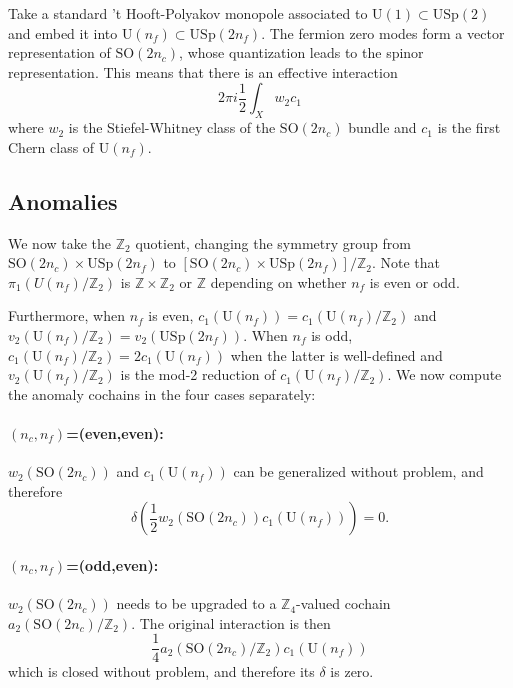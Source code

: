 \documentclass[12pt]{article}
\numberwithin{equation}{section}
\def\bZ{\mathbb{Z}}
\def\U{\mathrm{U}}
\def\SO{\mathrm{SO}}
\def\USp{\mathrm{USp}}
\begin{document}
Take a standard 't Hooft-Polyakov monopole associated to $\U(1)\subset \USp(2)$
and embed it into  $\U(n_f)\subset \USp(2n_f)$.
The fermion zero modes form a vector representation of $\SO(2n_c)$,
whose quantization leads to the spinor representation.
This means that there is an effective interaction \begin{equation}
2\pi i \frac12 \int_X w_2 c_1
\end{equation} where $w_2$ is the Stiefel-Whitney class of the $\SO(2n_c)$ bundle
and $c_1$ is the first Chern class of $\U(n_f)$.

\subsection{Anomalies}
We now take the $\bZ_2$ quotient, changing the symmetry group from 
$\SO(2n_c)\times \USp(2n_f)$ to $[\SO(2n_c)\times \USp(2n_f)]/\bZ_2$.
Note that $\pi_1(U(n_f)/\bZ_2)$ is $\bZ\times \bZ_2$  or $\bZ$ depending on whether $n_f$ is even or odd.

Furthermore, when $n_f$ is even, $c_1(\U(n_f)) = c_1(\U(n_f)/\bZ_2)$ and $v_2(\U(n_f)/\bZ_2)=v_2(\USp(2n_f))$.
When $n_f$ is odd, $c_1(\U(n_f)/\bZ_2)=2 c_1(\U(n_f))$ when the latter is well-defined and $v_2(\U(n_f)/\bZ_2)$ is the mod-2 reduction of $c_1(\U(n_f)/\bZ_2)$.
We now compute the anomaly cochains in the four cases separately:
\paragraph{$(n_c,n_f)$=(even,even):}
$w_2(\SO(2n_c))$ and $c_1(\U(n_f))$ can be generalized without problem,
and therefore \begin{equation}
\delta(\frac12 w_2(\SO(2n_c)) c_1(\U(n_f))) = 0.
\end{equation}

\paragraph{$(n_c,n_f)$=(odd,even):}
$w_2(\SO(2n_c))$ needs to be upgraded to a $\bZ_4$-valued cochain $a_2(\SO(2n_c)/\bZ_2)$.
The original interaction is then \begin{equation}
\frac14 a_2(\SO(2n_c)/\bZ_2) c_1(\U(n_f))
\end{equation}
which is closed without problem,
and therefore its $\delta$ is zero.
\end{document}
